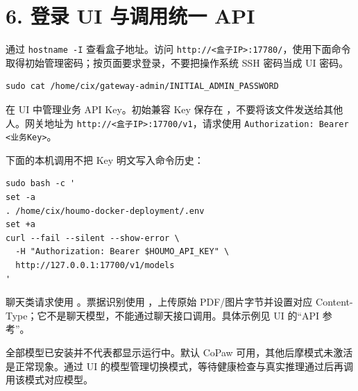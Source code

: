 \documentclass[UTF8,a4paper,zihao=-4,fontset=windows]{ctexart}
\begin{document}
\section*{6. 登录 UI 与调用统一 API}
通过 \texttt{hostname -I} 查看盒子地址。访问 \texttt{http://<盒子IP>:17780/}，使用下面命令取得初始管理密码；按页面要求登录，不要把操作系统 SSH 密码当成 UI 密码。\par
\par\noindent\begin{minipage}{\linewidth}\begin{lstlisting}
sudo cat /home/cix/gateway-admin/INITIAL_ADMIN_PASSWORD
\end{lstlisting}\end{minipage}\par
在 UI 中管理业务 API Key。初始兼容 Key 保存在 ，不要将该文件发送给其他人。网关地址为 \texttt{http://<盒子IP>:17700/v1}，请求使用 \texttt{Authorization: Bearer <业务Key>}。\par
下面的本机调用不把 Key 明文写入命令历史：\par
\par\noindent\begin{minipage}{\linewidth}\begin{lstlisting}
sudo bash -c '
set -a
. /home/cix/houmo-docker-deployment/.env
set +a
curl --fail --silent --show-error \
  -H "Authorization: Bearer $HOUMO_API_KEY" \
  http://127.0.0.1:17700/v1/models
'
\end{lstlisting}\end{minipage}\par
聊天类请求使用 。票据识别使用 ，上传原始 PDF/图片字节并设置对应 Content-Type；它不是聊天模型，不能通过聊天接口调用。具体示例见 UI 的“API 参考”。\par
全部模型已安装并不代表都显示运行中。默认 CoPaw 可用，其他后摩模式未激活是正常现象。通过 UI 的模型管理切换模式，等待健康检查与真实推理通过后再调用该模式对应模型。\par
\end{document}
